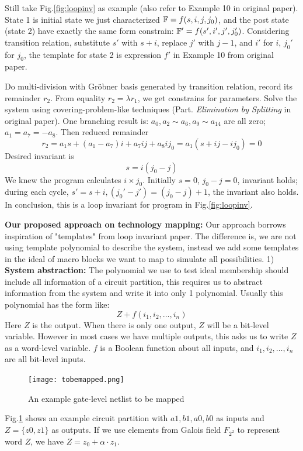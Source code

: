 Still take Fig.\ref{fig:loopinv} as example (also refer to Example 10 in original paper). State 1 is initial state we 
just characterized ${\mathbb{F}} = f(s,i,j,j_0)$, and the post state (state 2) have exactly the same form constrain:
${\mathbb{F}}' = f(s',i',j',j_0')$. Considering transition relation, substitute $s'$ with $s+i$, replace $j'$
with $j-1$, and $i'$ for $i$, $j_0'$ for $j_0$, the template for state 2 is expression $f'$ in Example 10 from
original paper.

Do multi-division with Gr\"obner basis generated by transition relation, record its remainder $r_2$.
From equality $r_2 = \lambda r_1$, we get constrains for parameters. Solve the system using covering-problem-like
techniques (Part. \emph{Elimination by Splitting} in original paper). One branching result is:
$a_0,a_2\sim a_6, a_9\sim a_{14}$ are all zero; $a_1=a_7=-a_8$. Then reduced remainder 
$$r_2 = a_1s +(a_1-a_7)i+a_7ij+a_8ij_0 = a_1(s+ij-ij_0) = 0$$
Desired invariant is 
$$s = i(j_0- j)$$
We knew the program calculates $i\times j_0$. Initially $s=0$, $j_0-j=0$, invariant holds;
during each cycle, $s'=s+i, (j_0'-j') = (j_0-j)+1$, the invariant also holds. In conclusion, this is a
loop invariant for program in Fig.\ref{fig:loopinv}.

{\bf Our proposed approach on technology mapping:}
Our approach borrows inspiration of "templates" from loop invariant paper. The difference is,
we are not using template polynomial to describe the system, instead we add some templates in the ideal
of macro blocks we want to map to simulate all possibilities.
1) {\bf System abstraction:}
The polynomial we use to test ideal membership should include all information of a circuit partition,
this requires us to abstract information from the system and write it into only 1 polynomial.
Usually this polynomial has the form like:
$$Z + f(i_1,i_2,\dots,i_n)$$
Here $Z$ is the output. When there is only one output, $Z$ will be a bit-level variable. However in most
cases we have multiple outputs, this asks us to write $Z$ as a word-level variable. $f$ is a Boolean
function about all inputs, and $i_1,i_2,\dots,i_n$ are all bit-level inputs.

\begin{figure}[hbt]
	\begin{center}
	\texttt{[image: tobemapped.png]}
	\end{center}
	\caption{An example gate-level netlist to be mapped}
	\label{fig:tobemapped}
\end{figure}

Fig.\ref{fig:tobemapped} shows an example circuit partition with $a1,b1,a0,b0$ as inputs and
$Z = \{z0,z1\}$ as outputs. If we use elements from Galois field $F_{2^2}$ to represent word $Z$,
we have $Z = z_0 + \alpha\cdot z_1$.

